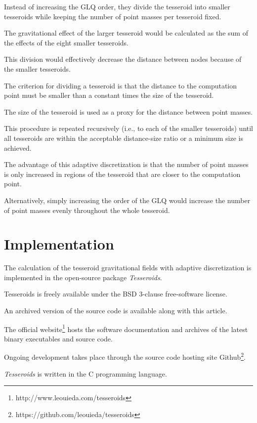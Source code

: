 \documentclass[paper,twocolumn]{geophysics}
\begin{document}
Instead of increasing the GLQ order,
they divide the tesseroid into smaller tesseroids while keeping the number of
point masses per tesseroid fixed.

The gravitational effect of the larger tesseroid would be calculated as the sum
of the effects of the eight smaller tesseroids.

This division would effectively decrease the distance between nodes because of
the smaller tesseroids.

The criterion for dividing a tesseroid is that
the distance to the computation point must be smaller than
a constant times the size of the tesseroid.

The size of the tesseroid is used as a proxy for the distance between point
masses.

This procedure is repeated recursively
(i.e., to each of the smaller tesseroids)
until all tesseroids are within the acceptable distance-size ratio
or a minimum size is achieved.


The advantage of this adaptive discretization is that the number of point
masses is only increased in regions of the tesseroid that are closer to the
computation point.

Alternatively, simply increasing the order of the GLQ would increase the number
of point masses evenly throughout the whole tesseroid.

\section{Implementation}

The calculation of the tesseroid gravitational fields with adaptive
discretization is implemented in the open-source package \textit{Tesseroids}.

Tesseroids is freely available under the BSD 3-clause free-software license.

An archived version of the source code is available along with this article.

The official website\footnote{http://www.leouieda.com/tesseroids}
hosts the software documentation and
archives of the latest binary executables and source code.

Ongoing development takes place through the source code hosting site
Github\footnote{https://github.com/leouieda/tesseroids}.



\textit{Tesseroids} is written in the C programming language.
\end{document}
